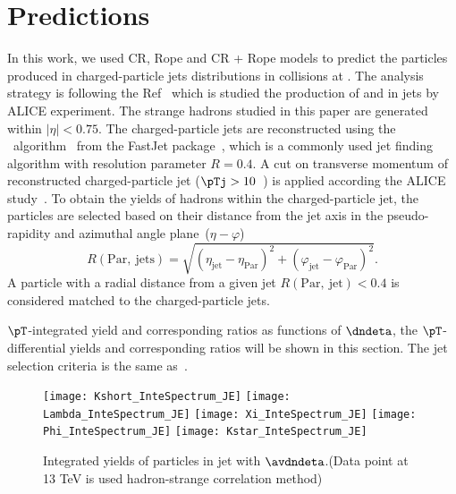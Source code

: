 \documentclass[ALICE,manyauthors]{StrinJet}
\begin{document}
\clearpage
\section{Predictions}
\label{sec:predic}
In this work, we used CR, Rope and CR + Rope models to predict the particles produced in charged-particle jets distributions in \pp collisions at \seven. The analysis strategy is following the Ref~\cite{ALICE:2021cvd} which is studied the production of \kzero and \lmb in jets by ALICE experiment. The strange hadrons studied in this paper are generated within $|\eta| < 0.75$. The charged-particle jets are reconstructed using the \akT\ algorithm~\cite{Cacciari:2008gp} from the FastJet package~\cite{Cacciari:2011ma, Cacciari:2005hq}, which is a commonly used jet finding algorithm with resolution parameter $R = 0.4$. A cut on transverse momentum of reconstructed charged-particle jet ($\pTj > 10$~\GeVc) is applied according the ALICE study~\cite{ALICE:2021cvd}. To obtain the yields of hadrons within the charged-particle jet, the particles are selected based on their distance from the jet axis in the pseudo-rapidity and azimuthal angle plane~($\eta - \varphi$)
\begin{equation}
	R(\mathrm{Par, ~jets}) = \sqrt{\left( \eta_\mathrm{jet} - \eta_\mathrm{Par} \right)^{2} + \left( \varphi_\mathrm{jet} - \varphi_\mathrm{Par} \right)^{2}}.
\end{equation}
A particle with a radial distance from a given jet $R (\mathrm{Par, ~jet}) < 0.4$ is considered matched to the charged-particle jets.

$\pT$-integrated yield and corresponding ratios as functions of $\dndeta$, the $\pT$-differential yields and corresponding ratios will be shown in this section. The jet selection criteria is the same as~\cite{ALICE:2021cvd}.
\begin{figure}[ht]
	\begin{center}
		\texttt{[image: Kshort\_InteSpectrum\_JE]}
		\texttt{[image: Lambda\_InteSpectrum\_JE]}
		\texttt{[image: Xi\_InteSpectrum\_JE]}
		\texttt{[image: Phi\_InteSpectrum\_JE]}
		\texttt{[image: Kstar\_InteSpectrum\_JE]}
	\end{center}
	\caption{Integrated yields of particles in jet with $\avdndeta$.(Data point at 13 TeV is used hadron-strange correlation method)}
	\label{fig:JCIntePar}
\end{figure}
\end{document}
